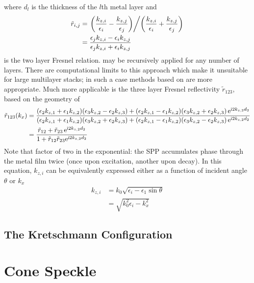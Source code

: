 \documentclass[a4paper,titlepage,onecolumn]{report}
\begin{document}
where $d_l$ is the thickness of the $l$th metal layer and 
\begin{align}
\tilde{r}_{i,j}&=
\left.\left(\frac{k_{z,i}}{\epsilon_i}-\frac{k_{z,j}}{\epsilon_j}\right)
\middle/
\left(\frac{k_{z,i}}{\epsilon_i}+\frac{k_{z,j}}{\epsilon_j}\right)\right.\\
&=\frac{\epsilon_j k_{z,i}-\epsilon_i k_{z,j}}
{\epsilon_j k_{z,i}+\epsilon_i k_{z,j}}
\end{align}
is the two layer Fresnel relation.   may be
recursively applied for any number of layers.  There are computational limits to this approach which make it unsuitable for large multilayer stacks; in such a case methods based on  are more appropriate.  Much more applicable is the three layer Fresnel reflectivity $\tilde{r}_{123}$, based on
the geometry of 
\begin{align}
\tilde{r}_{123}(k_x) &=
\frac{
  (\epsilon_2 k_{z,1}+\epsilon_1 k_{z,2})(\epsilon_3 k_{z,2}-\epsilon_2 k_{z,3})
+ (\epsilon_2 k_{z,1}-\epsilon_1 k_{z,2})(\epsilon_3 k_{z,2}+\epsilon_2 k_{z,3})\,
{\mathrm{e}}^{{\mathrm{i}} 2 k_{z,2} d_2}
}
{
  (\epsilon_2 k_{z,1}+\epsilon_1 k_{z,2})(\epsilon_3 k_{z,2}+\epsilon_2 k_{z,3})
+ (\epsilon_2 k_{z,1}-\epsilon_1 k_{z,2})(\epsilon_3 k_{z,2}-\epsilon_2 k_{z,3})\,
{\mathrm{e}}^{{\mathrm{i}} 2 k_{z,2} d_2}
}\\
&=
\frac{\tilde{r}_{12}+\tilde{r}_{23}\, {\mathrm{e}}^{{\mathrm{i}} 2 k_{z,2} d_2}} {1+\tilde{r}_{12} \tilde{r}_{23} {\mathrm{e}}^{{\mathrm{i}} 2 k_{z,2} d_2}}
\label{eqn:fresnel123}
\end{align}
Note that factor of two in the exponential: the SPP accumulates phase
through the metal film twice (once upon excitation, another upon decay).
In this equation, $k_{z,i}$ can be equivalently expressed either as a
function of incident angle $\theta$ or $k_x$
\begin{align}
k_{z,i} &= k_0 \sqrt{\epsilon_i - \epsilon_1 \sin \theta}\\
&= \sqrt{k_0^2\epsilon_i - k_x^2}
\end{align}\begin{flushleft}\begin{center}\end{center}\end{flushleft}
\section{The Kretschmann Configuration}

\chapter{Cone Speckle}
\end{document}
